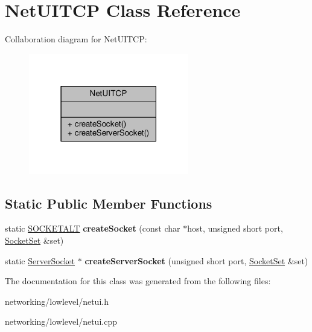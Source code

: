 \hypertarget{classNetUITCP}{}\section{Net\+U\+I\+T\+CP Class Reference}
\label{classNetUITCP}


Collaboration diagram for Net\+U\+I\+T\+CP\+:
\nopagebreak
\begin{figure}[H]
\begin{center}
\leavevmode
\includegraphics[width=198pt]{d8/dcd/classNetUITCP__coll__graph}
\end{center}
\end{figure}
\subsection*{Static Public Member Functions}
\begin{DoxyCompactItemize}
\item 
static \hyperlink{classSOCKETALT}{S\+O\+C\+K\+E\+T\+A\+LT} {\bfseries create\+Socket} (const char $\ast$host, unsigned short port, \hyperlink{classSocketSet}{Socket\+Set} \&set)\hypertarget{classNetUITCP_aec730abf689814589ac4ab10f33c2ceb}{}\label{classNetUITCP_aec730abf689814589ac4ab10f33c2ceb}

\item 
static \hyperlink{structServerSocket}{Server\+Socket} $\ast$ {\bfseries create\+Server\+Socket} (unsigned short port, \hyperlink{classSocketSet}{Socket\+Set} \&set)\hypertarget{classNetUITCP_a1fde62d1d9405249966bfffe9513ca74}{}\label{classNetUITCP_a1fde62d1d9405249966bfffe9513ca74}

\end{DoxyCompactItemize}


The documentation for this class was generated from the following files\+:\begin{DoxyCompactItemize}
\item 
networking/lowlevel/netui.\+h\item 
networking/lowlevel/netui.\+cpp\end{DoxyCompactItemize}
